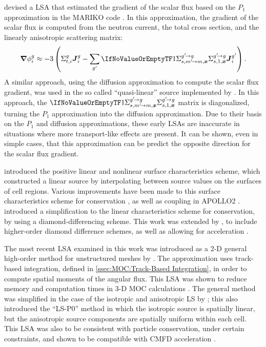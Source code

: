 {{{            \citeauthor{Petkov1998} devised a \ac{LSA} that estimated the gradient of the scalar flux based on the $P_1$ approximation in the MARIKO code \cite{Petkov1998,Petkov1999}.
            In this approximation, the gradient of the scalar flux is computed from the neutron current, the total cross section, and the linearly anisotropic scattering matrix:
            \begin{equation}\label{eq:MOC:LSA:Current2Gradient}
                \grad\sflux \approx -3\left(\xst\current - \suml[\gprime]\xss[1]\current[i][\gprime]\right).
            \end{equation}
            A similar approach, using the diffusion approximation to compute the scalar flux gradient, was used in the so called ``quasi-linear'' source implemented by \citet{Rabiti2009}.
            In this approach, the $\xss[1]$ matrix is diagonalized, turning the $P_1$ approximation into the diffusion approximation.
            Due to their basis on the $P_1$ and diffusion approximations, these early \acp{LSA} are inaccurate in situations where more transport-like effects are present.
            It can be shown, even in simple cases, that this approximation can be predict the opposite direction for the scalar flux gradient.

            \citet{Santandrea2002} introduced the positive linear and nonlinear surface characteristics scheme, which constructed a linear source by interpolating between source values on the surfaces of cell regions.
            Various improvements have been made to this surface characteristics scheme for conservation \cite{Santandrea2002}, as well as coupling in APOLLO2 \cite{Santandrea2008}.
            \citet{LeTellier2006} introduced a simplification to the linear characteristics scheme for conservation, by using a diamond-differencing scheme.
            This work was extended by \citet{Hebert2016}, to include higher-order diamond difference schemes, as well as allowing for acceleration \cite{Hebert2017}.

            The most recent \ac{LSA} examined in this work was introduced as a 2-D general high-order method for unstructured meshes by \citet{Masiello2009}.
            The approximation uses track-based integration, defined in \cref{ssec:MOC:Track-Based Integration}, in order to compute spatial moments of the angular flux.
            This \ac{LSA} was shown to reduce memory and computation times in 3-D \ac{MOC} calculations \cite{Chai2009}.
            The general method was simplified in the case of the isotropic and anisotropic \ac{LS} by \citet{Ferrer2016}; this also introduced the ``LS-P0'' method in which the isotropic source is spatially linear, but the anisotropic source components are spatially uniform within each cell.
            This \ac{LSA} was also to be consistent with particle conservation, under certain constraints, and shown to be compatible with \ac{CMFD} acceleration \cite{Ferrer2018}.

}}}
